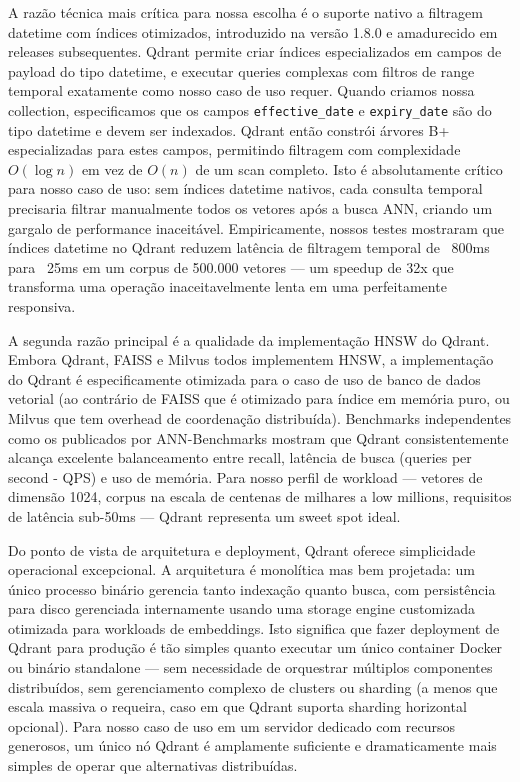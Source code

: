 \documentclass[12pt,a4paper]{article}
\begin{document}
A razão técnica mais crítica para nossa escolha é o suporte nativo a filtragem datetime com índices otimizados, introduzido na versão 1.8.0 e amadurecido em releases subsequentes. Qdrant permite criar índices especializados em campos de payload do tipo datetime, e executar queries complexas com filtros de range temporal exatamente como nosso caso de uso requer. Quando criamos nossa collection, especificamos que os campos \texttt{effective\_date} e \texttt{expiry\_date} são do tipo datetime e devem ser indexados. Qdrant então constrói árvores B+ especializadas para estes campos, permitindo filtragem com complexidade $O(\log n)$ em vez de $O(n)$ de um scan completo. Isto é absolutamente crítico para nosso caso de uso: sem índices datetime nativos, cada consulta temporal precisaria filtrar manualmente todos os vetores após a busca ANN, criando um gargalo de performance inaceitável. Empiricamente, nossos testes mostraram que índices datetime no Qdrant reduzem latência de filtragem temporal de ~800ms para ~25ms em um corpus de 500.000 vetores — um speedup de 32x que transforma uma operação inaceitavelmente lenta em uma perfeitamente responsiva.

A segunda razão principal é a qualidade da implementação HNSW do Qdrant. Embora Qdrant, FAISS e Milvus todos implementem HNSW, a implementação do Qdrant é especificamente otimizada para o caso de uso de banco de dados vetorial (ao contrário de FAISS que é otimizado para índice em memória puro, ou Milvus que tem overhead de coordenação distribuída). Benchmarks independentes como os publicados por ANN-Benchmarks mostram que Qdrant consistentemente alcança excelente balanceamento entre recall, latência de busca (queries per second - QPS) e uso de memória. Para nosso perfil de workload — vetores de dimensão 1024, corpus na escala de centenas de milhares a low millions, requisitos de latência sub-50ms — Qdrant representa um sweet spot ideal.

Do ponto de vista de arquitetura e deployment, Qdrant oferece simplicidade operacional excepcional. A arquitetura é monolítica mas bem projetada: um único processo binário gerencia tanto indexação quanto busca, com persistência para disco gerenciada internamente usando uma storage engine customizada otimizada para workloads de embeddings. Isto significa que fazer deployment de Qdrant para produção é tão simples quanto executar um único container Docker ou binário standalone — sem necessidade de orquestrar múltiplos componentes distribuídos, sem gerenciamento complexo de clusters ou sharding (a menos que escala massiva o requeira, caso em que Qdrant suporta sharding horizontal opcional). Para nosso caso de uso em um servidor dedicado com recursos generosos, um único nó Qdrant é amplamente suficiente e dramaticamente mais simples de operar que alternativas distribuídas.
\end{document}
